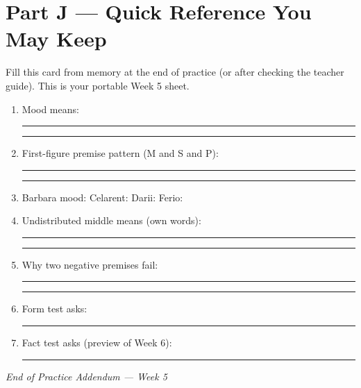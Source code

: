 \documentclass[11pt]{article}
\newcommand{\ansline}{\par\vspace{0.15em}\noindent\rule{\linewidth}{0.4pt}\par\vspace{0.08em}}
\newcommand{\twolines}{\ansline\ansline}
\begin{document}
\newpage
\section*{Part J --- Quick Reference You May Keep}
\noindent Fill this card from memory at the end of practice (or after checking the teacher guide). This is your portable Week 5 sheet.

\begin{enumerate}
\item Mood means: \twolines

\item First-figure premise pattern (M and S and P): \twolines

\item Barbara mood: \underline{\hspace{0.8in}} \quad Celarent: \underline{\hspace{0.8in}} \quad Darii: \underline{\hspace{0.8in}} \quad Ferio: \underline{\hspace{0.8in}}

\item Undistributed middle means (own words): \twolines

\item Why two negative premises fail: \twolines

\item Form test asks: \ansline

\item Fact test asks (preview of Week 6): \ansline
\end{enumerate}

\vspace{0.5em}
\begin{center}
\textit{End of Practice Addendum --- Week 5}
\end{center}
\end{document}
